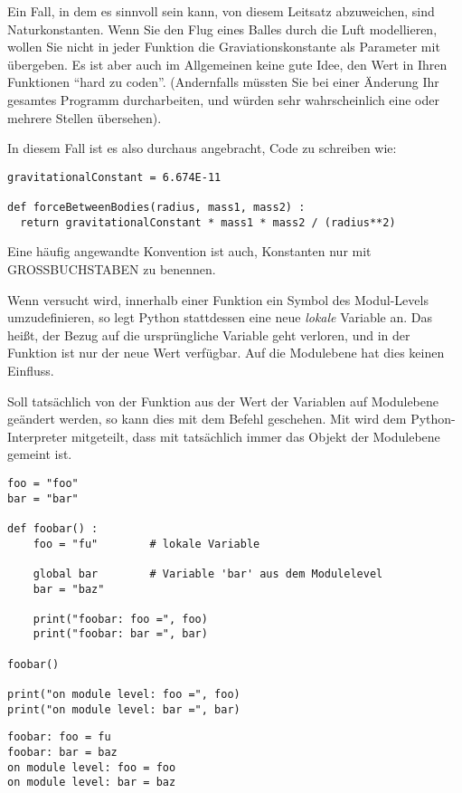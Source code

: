 \begin{hintbox}[Konstanten]
Ein Fall, in dem es sinnvoll sein kann, von diesem Leitsatz abzuweichen, sind Naturkonstanten. Wenn Sie den Flug eines Balles durch die Luft modellieren, wollen Sie nicht in jeder Funktion die Graviationskonstante als Parameter mit übergeben. Es ist aber auch im Allgemeinen keine gute Idee, den Wert in Ihren Funktionen \enquote{hard zu coden}. (Andernfalls müssten Sie bei einer Änderung Ihr gesamtes Programm durcharbeiten, und würden sehr wahrscheinlich eine oder mehrere Stellen übersehen).
\end{hintbox}
\begin{hintbox}[]
In diesem Fall ist es also durchaus angebracht, Code zu schreiben wie:
\begin{codebox}
\begin{verbatim}
gravitationalConstant = 6.674E-11

def forceBetweenBodies(radius, mass1, mass2) :
  return gravitationalConstant * mass1 * mass2 / (radius**2)
\end{verbatim}
\end{codebox}

Eine häufig angewandte Konvention ist auch, Konstanten nur mit GROSSBUCHSTABEN zu benennen.
\end{hintbox}

Wenn versucht wird, innerhalb einer Funktion ein Symbol des Modul-Levels umzudefinieren, so legt Python stattdessen eine neue \emph{lokale} Variable an. Das heißt, der Bezug auf die ursprüngliche Variable geht verloren, und in der Funktion ist nur der neue Wert verfügbar. Auf die Modulebene hat dies keinen Einfluss.

Soll tatsächlich von der Funktion aus der Wert der Variablen auf Modulebene geändert werden, so kann dies mit dem Befehl  geschehen. Mit  wird dem Python-Interpreter mitgeteilt, dass mit  tatsächlich immer das Objekt der Modulebene gemeint ist.

\begin{codebox}
\begin{verbatim}
foo = "foo"
bar = "bar"

def foobar() :
    foo = "fu"        # lokale Variable
  
    global bar        # Variable 'bar' aus dem Modulelevel
    bar = "baz"

    print("foobar: foo =", foo)
    print("foobar: bar =", bar)

foobar()

print("on module level: foo =", foo)
print("on module level: bar =", bar)
\end{verbatim}
\end{codebox}
\begin{cmdbox}
\begin{verbatim}
foobar: foo = fu
foobar: bar = baz
on module level: foo = foo
on module level: bar = baz
\end{verbatim}
\end{cmdbox}

